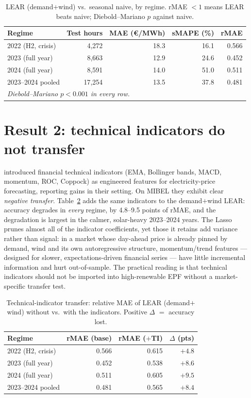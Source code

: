 \documentclass[11pt,a4paper]{article}
\begin{document}
\begin{table}[t]
\centering\small
\caption{LEAR (demand$+$wind) vs.\ seasonal naive, by regime. rMAE $<1$ means LEAR
beats naive; Diebold--Mariano $p$ against naive.}
\label{tab:lear}
\begin{tabular}{lrrrr}
\toprule
Regime & Test hours & MAE (\euro/MWh) & sMAPE (\%) & rMAE \\
\midrule
2022 (H2, crisis) & 4{,}272  & 18.3 & 16.1 & 0.566 \\
2023 (full year)  & 8{,}663  & 12.9 & 24.6 & 0.452 \\
2024 (full year)  & 8{,}591  & 14.0 & 51.0 & 0.511 \\
2023--2024 pooled & 17{,}254 & 13.5 & 37.8 & 0.481 \\
\midrule
\multicolumn{5}{l}{\emph{Diebold--Mariano $p<0.001$ in every row.}}\\
\bottomrule
\end{tabular}
\end{table}

\section{Result 2: technical indicators do not transfer}

\citet{demir2020} introduced financial technical indicators (EMA, Bollinger bands,
MACD, momentum, ROC, Coppock) as engineered features for electricity-price
forecasting, reporting gains in their setting. On MIBEL they exhibit clear
\emph{negative transfer}. Table~\ref{tab:ti} adds the same indicators to the
demand$+$wind LEAR: accuracy degrades in \emph{every} regime, by 4.8--9.5 points of
rMAE, and the degradation is largest in the calmer, solar-heavy 2023--2024 years.
The Lasso prunes almost all of the indicator coefficients, yet those it retains add
variance rather than signal: in a market whose day-ahead price is already pinned by
demand, wind and its own autoregressive structure, momentum/trend features ---
designed for slower, expectations-driven financial series --- have little
incremental information and hurt out-of-sample. The practical reading is that
technical indicators should not be imported into high-renewable EPF without a
market-specific transfer test.

\begin{table}[t]
\centering\small
\caption{Technical-indicator transfer: relative MAE of LEAR (demand$+$wind) without
vs.\ with the \citet{demir2020} indicators. Positive $\Delta$ $=$ accuracy lost.}
\label{tab:ti}
\begin{tabular}{lrrr}
\toprule
Regime & rMAE (base) & rMAE ($+$TI) & $\Delta$ (pts) \\
\midrule
2022 (H2, crisis) & 0.566 & 0.615 & $+4.8$ \\
2023 (full year)  & 0.452 & 0.538 & $+8.6$ \\
2024 (full year)  & 0.511 & 0.605 & $+9.5$ \\
2023--2024 pooled & 0.481 & 0.565 & $+8.4$ \\
\bottomrule
\end{tabular}
\end{table}
\end{document}

